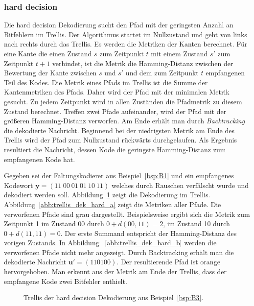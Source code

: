 \subsubsection{hard decision}
\label{kapitel:grundlagen_hard_decision}
Die hard decision Dekodierung sucht den Pfad mit der geringsten Anzahl an Bitfehlern im Trellis. Der Algorithmus startet im Nullzustand und geht von links nach rechts durch das Trellis. Es werden die Metriken der Kanten berechnet. Für eine Kante die einen Zustand $s$ zum Zeitpunkt $t$ mit einem Zustand $s'$ zum Zeitpunkt $t+1$ verbindet, ist die Metrik die Hamming-Distanz zwischen der Bewertung der Kante zwischen $s$ und $s'$ und dem zum Zeitpunkt $t$ empfangenen Teil des Kodes. Die Metrik eines Pfads im Trellis ist die Summe der Kantenmetriken des Pfads. Daher wird der Pfad mit der minimalen Metrik gesucht. Zu jedem Zeitpunkt wird in allen Zuständen die Pfadmetrik zu diesem Zustand berechnet. Treffen zwei Pfade aufeinander, wird der Pfad mit der größeren Hamming-Distanz verworfen. Am Ende erhält man durch \emph{Backtracking} die dekodierte Nachricht. Beginnend bei der niedrigsten Metrik am Ende des Trellis wird der Pfad zum Nullzustand rückwärts durchgelaufen. Als Ergebnis resultiert die Nachricht, dessen Kode die geringste Hamming-Distanz zum empfangenen Kode hat.
\begin{beispiel}
Gegeben sei der Faltungskodierer aus Beispiel~\ref{bsp:B1} und ein empfangenes Kodewort $\mathbf{y}=\left( 11~00~01~01~10~11\right)$ welches durch Rauschen verfälscht wurde und dekodiert werden soll. Abbildung~\ref{abb:trellis_dekodierung_hard} zeigt die Dekodierung im Trellis. Abbildung~\ref{abb:trellis_dek_hard_a} zeigt die Metriken aller Pfade. Die verworfenen Pfade sind grau dargestellt. Beispielsweise ergibt sich die Metrik zum Zeitpunkt 1 im Zustand 00 durch $0+d(00,11)=2$, im Zustand 10 durch $0+d(11,11)=0$. Der erste Summand entspricht der Hamming-Distanz des vorigen Zustands. In Abbildung~ \ref{abb:trellis_dek_hard_b} werden die verworfenen Pfade nicht mehr angezeigt. Durch Backtracking erhält man die dekodierte Nachricht $\mathbf{u'}=\left( 110100\right)$. Der resultierende Pfad ist orange hervorgehoben. Man erkennt aus der Metrik am Ende der Trellis, dass der empfangene Kode zwei Bitfehler enthielt.
\label{bsp:B3}
\end{beispiel}

\begin{figure}[t]
	\centering
	\caption{Trellis der hard decision Dekodierung aus Beispiel~\ref{bsp:B3}.}
	\label{abb:trellis_dekodierung_hard}
\end{figure}

